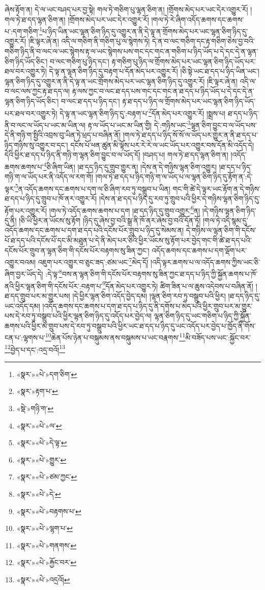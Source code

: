 ཞེས་རྟོག་ན། དེ་ལ་ཡང་བཤད་པར་བྱ་སྟེ། གལ་ཏེ་གཅིག་པུ་ལྷན་ཅིག་ན། །གྲོགས་མེད་པར་ཡང་དེར་འགྱུར་རོ། །གལ་ཏེ་ཐ་དད་ལྷན་ཅིག་ན། །གྲོགས་མེད་པར་ཡང་དེར་འགྱུར་རོ། །གལ་ཏེ་རེ་ཞིག་འདོད་ཆགས་དང་ཆགས་པ་:དག་གཅིག་\footnote{«སྣར་»«པེ་»དག་ཅིག་}པ་ཉིད་ཡིན་ཡང་ལྷན་ཅིག་ཉིད་དུ་འགྱུར་ན་ནི་དེ་ལྟ་ན་གྲོགས་མེད་པར་ཡང་ལྷན་ཅིག་ཉིད་དུ་འགྱུར་རོ། །ཇི་ལྟར་ཞེ་ན། འདི་ལ་གཅིག་ནི་གཅིག་པུ་ལ་སྙེགས་ཏེ། དེ་ན་བ་ལང་གཅིག་དང་རྟ་གཅིག་ཅེས་བྱ་བའི་གཅིག་ཉིད་ནི་བ་ལང་ལ་ཡང་སྙེགས་རྟ་ལ་ཡང་སྙེགས་པས་གང་དང་གང་ན་གཅིག་པ་ཉིད་ཡོད་པ་དེ་དང་དེ་ན་ལྷན་ཅིག་ཉིད་ཡོད་ཅིང་། བ་ལང་གཅིག་པུ་ཉིད་དང་། རྟ་གཅིག་པུ་ཉིད་ལ་གྲོགས་མེད་པར་ཡང་ལྷན་ཅིག་ཉིད་ཡོད་པར་ཐལ་བར་འགྱུར་ཏེ། དེ་ལྟ་ན་ལྷན་ཅིག་ཉིད་དུ་བརྟག་པ་དོན་མེད་པར་འགྱུར་རོ། །ཅི་སྟེ་ཡང་ཐ་དད་པ་ཉིད་ཡིན་ཡང་། ལྷན་ཅིག་ཉིད་དུ་འགྱུར་ན་ནི་དེ་ལྟ་ན་ཡང་གྲོགས་མེད་པར་ཡང་ལྷན་ཅིག་ཉིད་དུ་འགྱུར་རོ། །ཇི་ལྟར་ཞེ་ན། འདི་ལ་བ་ལང་ལས་ཀྱང་རྟ་ཐ་དད་ལ། རྟ་ལས་ཀྱང་བ་ལང་ཐ་དད་པས་གང་དང་གང་ན་ཐ་དད་པ་ཉིད་ཡོད་པ་དེ་དང་དེ་ན་ལྷན་ཅིག་ཉིད་ཡོད་ཅིང་། བ་ལང་ཐ་དད་པ་ཉིད་དང་། རྟ་ཐ་དད་པ་ཉིད་ལ་གྲོགས་མེད་པར་ཡང་ལྷན་ཅིག་ཉིད་ཡོད་པར་ཐལ་བར་འགྱུར་ཏེ། དེ་ལྟ་ན་ཡང་ལྷན་ཅིག་ཉིད་དུ་:བརྟག་པ་\footnote{«སྣར་»རྟག་པ་}དོན་མེད་པར་འགྱུར་རོ། །སྨྲས་པ། ཐ་དད་པ་ཉིད་ནི་བ་ལང་ལ་ཡོད་པ་ཡང་མ་ཡིན་ལ། རྟ་ལ་ཡོད་པ་ཡང་མ་ཡིན་གྱི། དེ་:གཉིས་ཡང་\footnote{«སྡེ་»གཉི་ག་}ལྷན་ཅིག་བྱུང་བ་ལ་ཡོད་པས་དེ་ནི་གཉི་ག་སྤྱིའི་འབྲས་བུ་ཡིན་ཏེ་ཕྲད་པ་བཞིན་ནོ། །གལ་ཏེ་ཐ་དད་པ་ཉིད་སོ་སོ་ལ་ཡོད་པར་གྱུར་ན་ནི་ཐ་དད་པ་ཉིད་གཉིས་སུ་འགྱུར་བ་དང་། དངོས་པོ་ཕན་ཚུན་མི་ལྟོས་པར་རེ་རེ་ལ་ཡང་ཡོད་པར་འགྱུར་བས་དོན་མི་འདོད་དེ། དེའི་ཕྱིར་ཐ་དད་པ་ཉིད་ནི་གཉི་ག་ལྷན་ཅིག་བྱུང་བ་ལ་ཡོད་དོ། །བཤད་པ། གལ་ཏེ་ཐ་དད་ལྷན་ཅིག་ན། །འདོད་ཆགས་ཆགས་པ་\footnote{«སྣར་»«པེ་»ལ་}ཅི་ཞིག་ཡིན། །ཐ་དད་ཉིད་དུ་གྲུབ་གྱུར་ན། །དེས་ན་དེ་གཉིས་ལྷན་ཅིག་འགྱུར། །ཐ་དད་པ་ཉིད་གཉི་ག་ལ་ཡོད་པར་ནི་འདོད་ལ་རག་གོ། །གལ་ཏེ་ཐ་དད་པ་ཉིད་གཉི་ག་ལ་ཡོད་པ་ལ་ལྷན་ཅིག་ཉིད་དུ་རྟོག་ན་:དེ་ལྟར་\footnote{«སྣར་»«པེ་»དེ་ལྟ་}ན་འདོད་ཆགས་དང་ཆགས་པ་དག་ལ་ཅི་ཞིག་རབ་ཏུ་བསྒྲུབ་པ་ཡིན། གང་གི་ཚེ་དེ་ལྟར་ཡང་རྟོག་ན་དེ་གཉིས་ཐ་དད་པ་ཉིད་དུ་གྲུབ་པ་ཁོ་ནར་འགྱུར་རོ། །དེས་ན་ཐ་དད་པ་ཉིད་དུ་རབ་ཏུ་གྲུབ་པའི་ཕྱིར་དེ་གཉིས་ལྷན་ཅིག་ཉིད་དུ་རྟོག་པར་འགྱུར་རོ། །གལ་ཏེ་འདོད་ཆགས་ཆགས་པ་དག །ཐ་དད་ཉིད་དུ་གྲུབ་འགྱུར་\footnote{«སྣར་»«པེ་»གྱུར་}ན། །དེ་གཉིས་ལྷན་ཅིག་ཉིད་དུ་ནི། །ཅི་ཡི་ཕྱིར་ན་ཡོངས་སུ་རྟོག །ཉིད་དུ་ཞེས་བྱ་བའི་སྒྲ་ནི་ཁོ་ནར་ཞེས་བྱ་བའི་དོན་ཏོ། །གལ་ཏེ་འདི་སྙམ་དུ་འདོད་ཆགས་དང་ཆགས་པ་དག་ཐ་དད་པའི་དངོས་པོར་གྲུབ་པ་ཉིད་དུ་སེམས་ན། དེ་གཉིས་ལ་ལྷན་ཅིག་གི་དངོས་པོ་ཐ་དད་པའི་དངོས་པོ་དང་མི་མཐུན་པ་དེ་ནི་མེད་པར་ཅིའི་ཕྱིར་ཡོངས་སུ་རྟོག་པར་བྱེད་གང་གི་ཚེ་ཐ་དད་པའི་དངོས་པོར་གྲུབ་ན་ལྷན་ཅིག་གི་དངོས་པོར་བརྟགས་སུ་ཟིན་ཀྱང་། འདོད་ཆགས་དང་ཆགས་པ་དག་ལྡོག་པར་འགྱུར་བའམ། འཇུག་པར་འགྱུར་བ་ཅུང་ཟད་:ཙམ་ཡང་\footnote{«སྣར་»«པེ་»ཙམ་ཀྱང་}མེད་དོ། །འདི་ལྟར་ཆགས་པ་ལ་འདོད་ཆགས་ཀྱིས་ཡང་ཅི་ཞིག་བྱར་ཡོད་དེ། :དེ་ལྟ་\footnote{«སྣར་»«པེ་»དེ་}བས་ན་ལྷན་ཅིག་གི་དངོས་པོར་བརྟགས་སུ་ཟིན་ཀྱང་ཐ་དད་པ་ཉིད་ཀྱི་སྐྱོན་ཆགས་པ་ཁོ་ནའི་ཕྱིར་ལྷན་ཅིག་གི་དངོས་པོར་:བརྟག་པ་\footnote{«སྣར་»«པེ་»བརྟགས་པ་}དོན་མེད་པར་འགྱུར་ཏེ། ཚིག་ཟིན་པ་ལ་ཆུས་འདེབས་པ་བཞིན་ནོ། །ཐ་དད་གྲུབ་པར་མ་གྱུར་པས། །དེ་ཕྱིར་ལྷན་ཅིག་འདོད་བྱེད་དམ། །ལྷན་ཅིག་རབ་ཏུ་བསྒྲུབ་པའི་ཕྱིར། །ཐ་དད་ཉིད་དུ་ཡང་འདོད་དམ། །འདོད་ཆགས་དང་ཆགས་པ་དག་ཐ་དད་པ་ཉིད་དུ་ནི་དགོས་པ་མེད་པའི་ཕྱིར་གྲུབ་པར་མ་གྱུར་པས་དེ་རབ་ཏུ་བསྒྲུབ་པའི་ཕྱིར་ལྷན་ཅིག་ཉིད་དུ་འདོད་པར་བྱེད་ལ། ལྷན་ཅིག་ཉིད་དུ་ཡང་གཅིག་པ་ཉིད་ཀྱི་སྐྱོན་ཆགས་པའི་ཕྱིར་མ་གྲུབ་པས་དེ་རབ་ཏུ་བསྒྲུབ་པའི་ཕྱིར་ཡང་ཐ་དད་པ་ཉིད་དུ་ཡང་འདོད་པར་བྱེད་པ་ཁྱོད་ནི་གོས་ངན་པ་:ལྷགས་པ་\footnote{«སྣར་»«པེ་»ལྷག་པ་}ཆེན་པོས་ཉེན་པ་བསྐུམས་ནས་བསྐུམས་པ་ཡང་བརྣགས་\footnote{«སྣར་»«པེ་»གནགས་}མི་བཟོད་པས་ཡང་:སྐྱོང་བར་\footnote{«སྣར་»«པེ་»རྐྱོང་བར་}བྱེད་པ་དང་:འདྲ་བའོ།\footnote{«སྣར་»«པེ་»འདྲའོ།} 